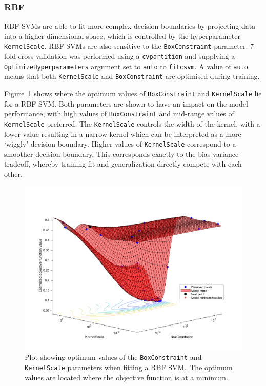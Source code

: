 \subsubsection{RBF}

RBF SVMs are able to fit more complex decision boundaries by projecting data
into a higher dimensional space, which is controlled by the hyperparameter
\texttt{KernelScale}. RBF SVMs are also sensitive to the \texttt{BoxConstraint}
parameter. 7-fold cross validation was performed using a \texttt{cvpartition}
and supplying a \texttt{OptimizeHyperparameters} argument set to \texttt{auto}
to \texttt{fitcsvm}. A value of \texttt{auto} means that both
\texttt{KernelScale} and \texttt{BoxConstraint} are optimised during training.

Figure~\ref{fig:rbf_optim} shows where the optimum values of
\texttt{BoxConstraint} and \texttt{KernelScale} lie for a RBF SVM\@. Both
parameters are shown to have an impact on the model performance, with high
values of \texttt{BoxConstraint} and mid-range values of \texttt{KernelScale}
preferred. The \texttt{KernelScale} controls the width of the kernel, with a
lower value resulting in a narrow kernel which can be interpreted as a more
`wiggly' decision boundary. Higher values of \texttt{KernelScale} correspond to
a smoother decision boundary. This corresponds exactly to the bias-variance
tradeoff, whereby training fit and generalization directly compete with each
other.

\begin{figure}[ht]
  \centering
  \includegraphics[width=\textwidth]{figures/rbf_optim.png}
  \caption{Plot showing optimum values of the \texttt{BoxConstraint} and
  \texttt{KernelScale} parameters when fitting a RBF SVM.\ The optimum values
are located where the objective function is at a
minimum.}\label{fig:rbf_optim}
\end{figure}


